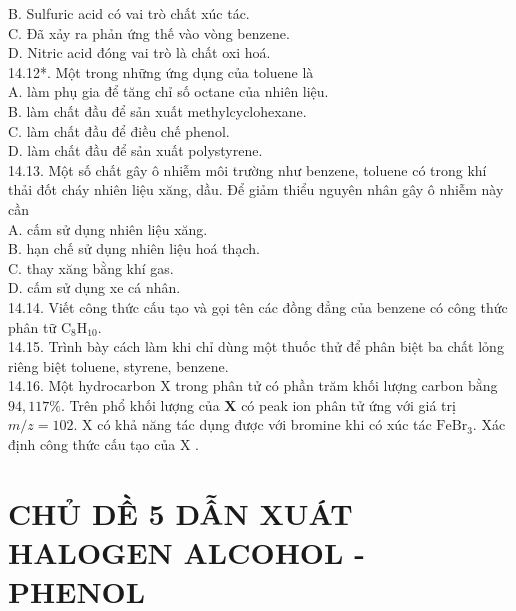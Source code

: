 \documentclass[10pt]{article}
\begin{document}
B. Sulfuric acid có vai trò chất xúc tác.\\
C. Đã xảy ra phản ứng thế vào vòng benzene.\\
D. Nitric acid đóng vai trò là chất oxi hoá.\\
14.12*. Một trong những ứng dụng của toluene là\\
A. làm phụ gia để tăng chỉ số octane của nhiên liệu.\\
B. làm chất đầu để sản xuất methylcyclohexane.\\
C. làm chất đầu để điều chế phenol.\\
D. làm chất đầu để sản xuất polystyrene.\\
14.13. Một số chất gây ô nhiễm môi trường như benzene, toluene có trong khí thải đốt cháy nhiên liệu xăng, dầu. Để giảm thiểu nguyên nhân gây ô nhiễm này cần\\
A. cấm sử dụng nhiên liệu xăng.\\
B. hạn chế sử dụng nhiên liệu hoá thạch.\\
C. thay xăng bằng khí gas.\\
D. cấm sử dụng xe cá nhân.\\
14.14. Viết công thức cấu tạo và gọi tên các đồng đẳng của benzene có công thức phân tữ $\mathrm{C}_{8} \mathrm{H}_{10}$.\\
14.15. Trình bày cách làm khi chỉ dùng một thuốc thử để phân biệt ba chất lỏng riêng biệt toluene, styrene, benzene.\\
14.16. Một hydrocarbon X trong phân tử có phần trăm khối lượng carbon bằng $94,117 \%$. Trên phổ khối lượng của $\mathbf{X}$ có peak ion phân tử ứng với giá trị $m / z=102$. X có khả năng tác dụng được với bromine khi có xúc tác $\mathrm{FeBr}_{3}$. Xác định công thức cấu tạo của X .

\section*{CHỦ DỀ 5 DẪN XUÁT HALOGEN ALCOHOL - PHENOL}
\end{document}
